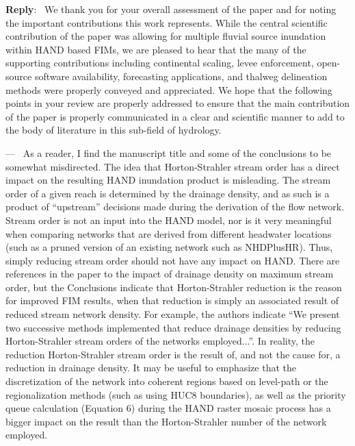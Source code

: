 \documentclass[11pt]{article}
\newcounter{reviewer}
\newcounter{point}[reviewer]
\renewcommand{\thepoint}{P\,\thereviewer.\arabic{point}}
\newenvironment{point}
   {\refstepcounter{point} \bigskip \noindent {\textbf{Reviewer~Point~\thepoint} } ---\ }
   {\par }
\newenvironment{reply}
   {\medskip \noindent \begin{sf}\textbf{Reply}:\  }
   {\medskip \end{sf}}
\begin{document}
\begin{reply}
We thank you for your overall assessment of the paper and for noting the important contributions this work represents.
While the central scientific contribution of the paper was allowing for multiple fluvial source inundation within HAND based FIMs, we are pleased to hear that the many of the supporting contributions including continental scaling, levee enforcement, open-source software availability, forecasting applications, and thalweg delineation methods were properly conveyed and appreciated.
We hope that the following points in your review are properly addressed to ensure that the main contribution of the paper is properly communicated in a clear and scientific manner to add to the body of literature in this sub-field of hydrology.
\end{reply}

\begin{point}
As a reader, I find the manuscript title and some of the conclusions to be somewhat misdirected.
The idea that Horton-Strahler stream order has a direct impact on the resulting HAND inundation product is misleading.
The stream order of a given reach is determined by the drainage density, and as such is a product of ``upstream'' decisions made during the derivation of the flow network.
Stream order is not an input into the HAND model, nor is it very meaningful when comparing networks that are derived from different headwater locations (such as a pruned version of an existing network such as NHDPlusHR).
Thus, simply reducing stream order should not have any impact on HAND.
There are references in the paper to the impact of drainage density on maximum stream order, but the Conclusions indicate that Horton-Strahler reduction is the reason for improved FIM results, when that reduction is simply an associated result of reduced stream network density.
For example, the authors indicate ``We present two successive methods implemented that reduce drainage densities by reducing Horton-Strahler stream orders of the networks employed...''.
In reality, the reduction Horton-Strahler stream order is the result of, and not the cause for, a reduction in drainage density.
It may be useful to emphasize that the discretization of the network into coherent regions based on level-path or the regionalization methods (such as using HUC8 boundaries), as well as the priority queue calculation (Equation 6) during the HAND raster mosaic process has a bigger impact on the result than the Horton-Strahler number of the network employed.
\end{point}
\end{document}
